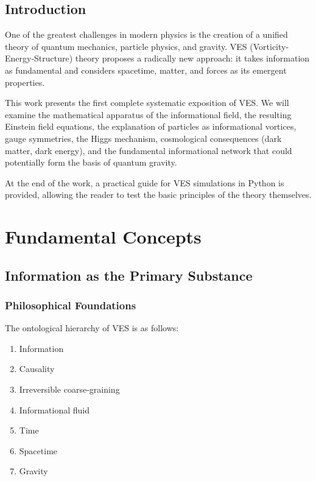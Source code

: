 \documentclass[12pt,a4paper]{book}
\begin{document}
\tableofcontents
\listoffigures

\chapter{Introduction}

One of the greatest challenges in modern physics is the creation of a unified theory of quantum mechanics, particle physics, and gravity. VES (Vorticity-Energy-Structure) theory proposes a radically new approach: it takes information as fundamental and considers spacetime, matter, and forces as its emergent properties.

This work presents the first complete systematic exposition of VES. We will examine the mathematical apparatus of the informational field, the resulting Einstein field equations, the explanation of particles as informational vortices, gauge symmetries, the Higgs mechanism, cosmological consequences (dark matter, dark energy), and the fundamental informational network that could potentially form the basis of quantum gravity.

At the end of the work, a practical guide for VES simulations in Python is provided, allowing the reader to test the basic principles of the theory themselves.

\part{Fundamental Concepts}

\chapter{Information as the Primary Substance}

\section{Philosophical Foundations}

The ontological hierarchy of VES is as follows:
\begin{enumerate}
    \item Information
    \item Causality
    \item Irreversible coarse-graining
    \item Informational fluid
    \item Time
    \item Spacetime
    \item Gravity
\end{enumerate}
\end{document}
